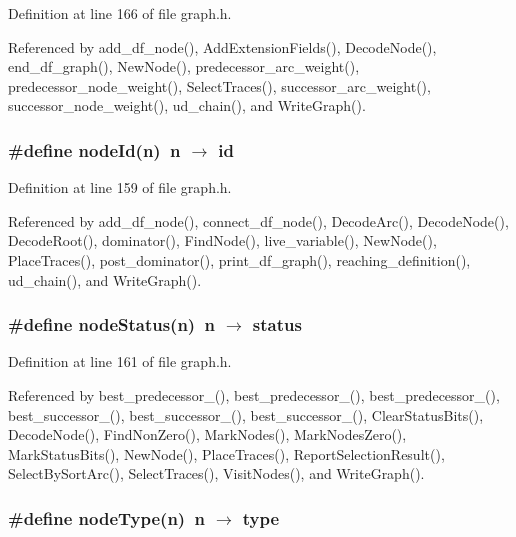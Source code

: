 Definition at line 166 of file graph.h.

Referenced by add\_\-df\_\-node(), Add\-Extension\-Fields(), Decode\-Node(), end\_\-df\_\-graph(), New\-Node(), predecessor\_\-arc\_\-weight(), predecessor\_\-node\_\-weight(), Select\-Traces(), successor\_\-arc\_\-weight(), successor\_\-node\_\-weight(), ud\_\-chain(), and Write\-Graph().
\subsubsection{\setlength{\rightskip}{0pt plus 5cm}\#define node\-Id(n)~n $\rightarrow$ id}\label{graph_8h_4ffa8aacdcb6e8166f1f4f98de202696}




Definition at line 159 of file graph.h.

Referenced by add\_\-df\_\-node(), connect\_\-df\_\-node(), Decode\-Arc(), Decode\-Node(), Decode\-Root(), dominator(), Find\-Node(), live\_\-variable(), New\-Node(), Place\-Traces(), post\_\-dominator(), print\_\-df\_\-graph(), reaching\_\-definition(), ud\_\-chain(), and Write\-Graph().
\subsubsection{\setlength{\rightskip}{0pt plus 5cm}\#define node\-Status(n)~n $\rightarrow$ status}\label{graph_8h_d27e0155cc7bd0b777ea506ed0244964}




Definition at line 161 of file graph.h.

Referenced by best\_\-predecessor\_(), best\_\-predecessor\_(), best\_\-predecessor\_(), best\_\-successor\_(), best\_\-successor\_(), best\_\-successor\_(), Clear\-Status\-Bits(), Decode\-Node(), Find\-Non\-Zero(), Mark\-Nodes(), Mark\-Nodes\-Zero(), Mark\-Status\-Bits(), New\-Node(), Place\-Traces(), Report\-Selection\-Result(), Select\-By\-Sort\-Arc(), Select\-Traces(), Visit\-Nodes(), and Write\-Graph().
\subsubsection{\setlength{\rightskip}{0pt plus 5cm}\#define node\-Type(n)~n $\rightarrow$ type}\label{graph_8h_f5c380b52c89325a1c66125e6a65d1f9}





